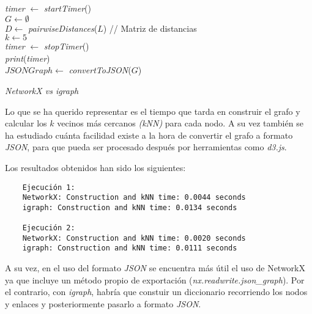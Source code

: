 \begin{algorithm}
	\label{testGraph}
	\BlankLine
	\textit{timer} $\leftarrow$ \textit{startTimer}()\\
	$G \leftarrow \emptyset$\\
	$D \leftarrow$ \textit{pairwiseDistances}($L$) // Matriz de distancias\\
	$k \leftarrow 5$\\
	\textit{timer} $\leftarrow$ \textit{stopTimer}()\\
	\textit{print}(\textit{timer})\\
	$JSONGraph \leftarrow$ \textit{convertToJSON}($G$)\\
	\caption{\textit{NetworkX vs igraph}}
\end{algorithm}

Lo que se ha querido representar es el tiempo que tarda en construir el grafo y calcular los $k$ vecinos más cercanos \textit{(kNN)} para cada nodo. A su vez también se ha estudiado cuánta facilidad existe a la hora de convertir el grafo a formato \textit{JSON}, para que pueda ser procesado después por herramientas como \textit{d3.js}.

Los resultados obtenidos han sido los siguientes:
\\
\begin{verbatim}
	Ejecución 1:
	NetworkX: Construction and kNN time: 0.0044 seconds
	igraph: Construction and kNN time: 0.0134 seconds
	
	Ejecución 2:
	NetworkX: Construction and kNN time: 0.0020 seconds
	igraph: Construction and kNN time: 0.0111 seconds
\end{verbatim}

A su vez, en el uso del formato \textit{JSON} se encuentra más útil el uso de NetworkX ya que incluye un método propio de exportación (\textit{nx.readwrite.json\_graph}).
Por el contrario, con \textit{igraph}, habría que constuir un diccionario recorriendo los nodos y enlaces y posteriormente pasarlo a formato \textit{JSON}.

